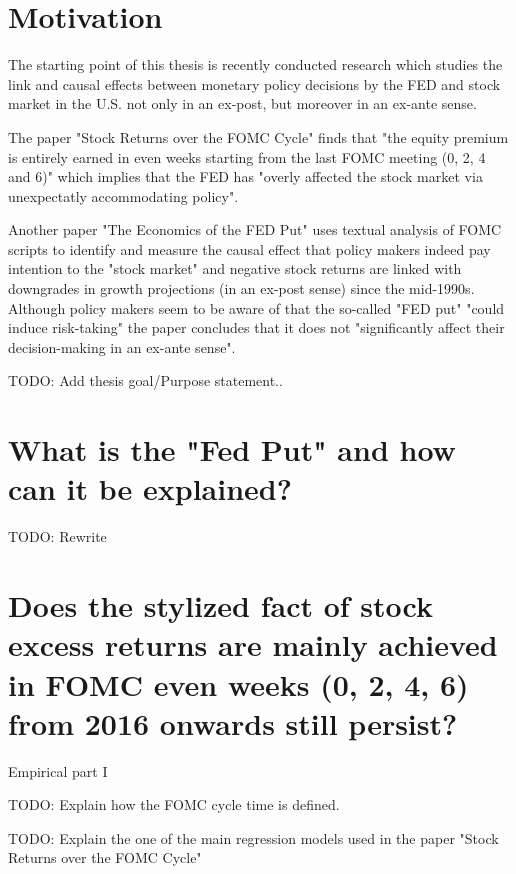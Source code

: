 
\chapter{Motivation}


The starting point of this thesis is recently conducted research which studies the link and causal effects between monetary policy decisions by the FED and stock market in the U.S.  not only in an ex-post,  but moreover in an ex-ante sense.

The paper "Stock Returns over the FOMC Cycle" \parencite{cieslak_stock_2019} finds that "the equity premium is entirely earned in even weeks starting from the last FOMC meeting (0,  2,  4 and 6)" which implies that the FED has "overly affected the stock market via unexpectatly accommodating policy". 

Another paper "The Economics of the FED Put"  \parencite{cieslak_economics_2020} uses textual analysis of FOMC scripts to identify and measure the causal effect that policy makers indeed pay intention to the "stock market" and negative stock returns are linked with downgrades in growth projections (in an ex-post sense) since the mid-1990s.  
Although policy makers seem to be aware of that the so-called "FED put" "could induce risk-taking" the paper concludes that it does not "significantly affect their decision-making in an ex-ante sense".

TODO: Add thesis goal/Purpose statement..


\chapter{What is the "Fed Put" and how can it be explained?}


TODO: Rewrite 


\chapter{Does the stylized fact of stock excess returns are mainly achieved in FOMC even weeks (0,  2,  4,  6) from 2016 onwards still persist?}



Empirical part I

TODO: Explain how the FOMC cycle time is defined.

TODO: Explain the one of the main regression models used in the paper "Stock Returns over the FOMC Cycle" \parencite{cieslak_stock_2019}

